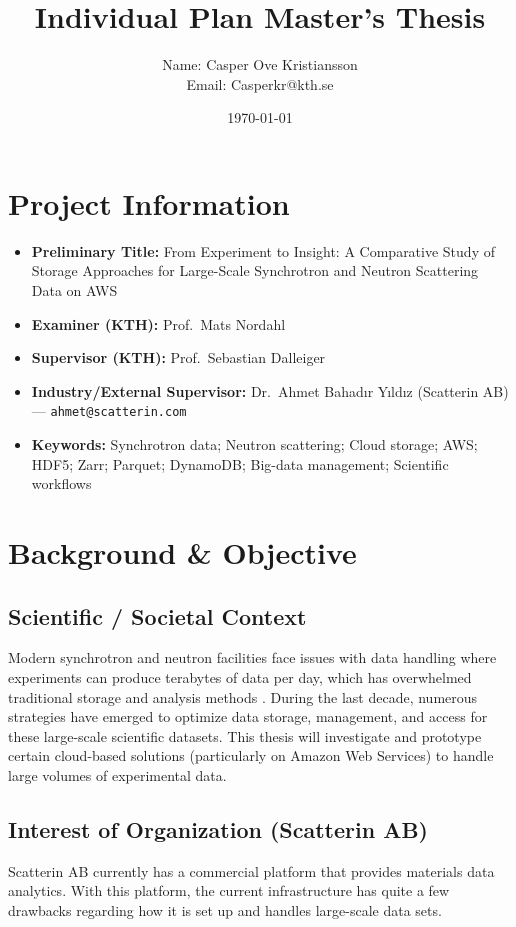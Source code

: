 \documentclass{article}
\title{Individual Plan Master's Thesis}
\author{Name: Casper Ove Kristiansson\\Email: Casperkr@kth.se}
\date{\today}
\begin{document}
\setlength\parindent{0pt}
\maketitle

\section{Project Information}
\begin{itemize}
  \item \textbf{Preliminary Title:} From Experiment to Insight: A Comparative Study of Storage Approaches for Large-Scale Synchrotron and Neutron Scattering Data on AWS
  \item \textbf{Examiner (KTH):} Prof.\ Mats Nordahl
  \item \textbf{Supervisor (KTH):} Prof.\ Sebastian Dalleiger
  \item \textbf{Industry/External Supervisor:} Dr.\ Ahmet Bahadır Yıldız (Scatterin AB) — \texttt{ahmet@scatterin.com}
  \item \textbf{Keywords:} Synchrotron data; Neutron scattering; Cloud storage; AWS; HDF5; Zarr; Parquet; DynamoDB; Big-data management; Scientific workflows
\end{itemize}




\section{Background \& Objective}
\subsection{Scientific / Societal Context}
Modern synchrotron and neutron facilities face issues with data handling where experiments can produce terabytes of data per day, which has overwhelmed traditional storage and analysis methods \cite{wang2018synchrotron}. During the last decade, numerous strategies have emerged to optimize data storage, management, and access for these large-scale scientific datasets. This thesis will investigate and prototype certain cloud-based solutions (particularly on Amazon Web Services) to handle large volumes of experimental data.

\subsection{Interest of Organization (Scatterin AB)}
Scatterin AB currently has a commercial platform that provides materials data analytics. With this platform, the current infrastructure has quite a few drawbacks regarding how it is set up and handles large-scale data sets.
\end{document}
